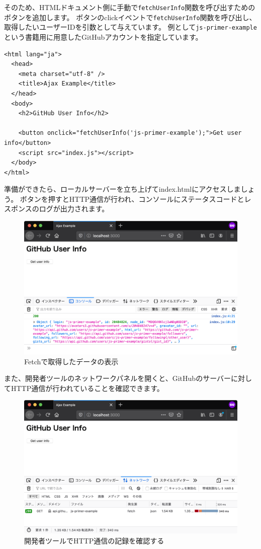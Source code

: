 そのため、HTMLドキュメント側に手動で\texttt{fetchUserInfo}関数を呼び出すためのボタンを追加します。
ボタンのclickイベントで\texttt{fetchUserInfo}関数を呼び出し、取得したいユーザーIDを引数として与えています。
例として\texttt{js-primer-example}という書籍用に用意したGitHubアカウントを指定しています。

\begin{lstlisting}
<html lang="ja">
  <head>
    <meta charset="utf-8" />
    <title>Ajax Example</title>
  </head>
  <body>
    <h2>GitHub User Info</h2>

    <button onclick="fetchUserInfo('js-primer-example');">Get user info</button>
    <script src="index.js"></script>
  </body>
</html>
\end{lstlisting}

準備ができたら、ローカルサーバーを立ち上げてindex.htmlにアクセスしましょう。
ボタンを押すとHTTP通信が行われ、コンソールにステータスコードとレスポンスのログが出力されます。

\begin{figure}[h]
\centering
\includegraphics[width=120mm]{fig/fig-2.png}
\caption{Fetchで取得したデータの表示}
\end{figure}

また、開発者ツールのネットワークパネルを開くと、GitHubのサーバーに対してHTTP通信が行われていることを確認できます。

\begin{figure}[h]
\centering
\includegraphics[width=120mm]{fig/fig-3.png}
\caption{開発者ツールでHTTP通信の記録を確認する}
\end{figure}


